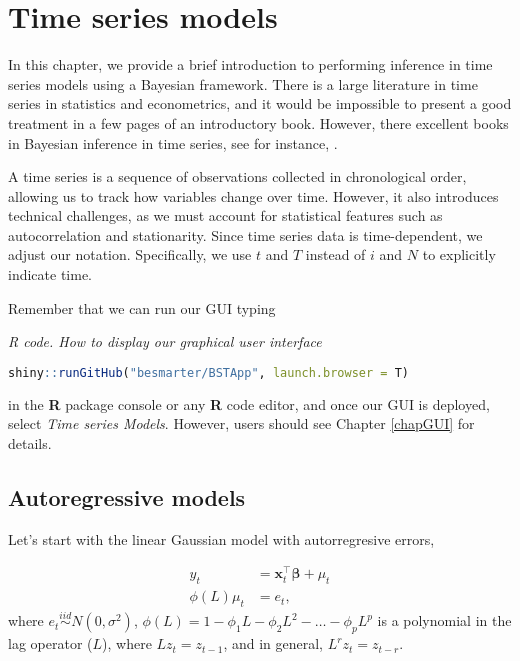 \chapter{Time series models}\label{chap8}
In this chapter, we provide a brief introduction to performing inference in time series models using a Bayesian framework. There is a large literature in time series in statistics and econometrics, and it would be impossible to present a good treatment in a few pages of an introductory book. However, there excellent books in Bayesian inference in time series, see for instance, \cite{west2006bayesian,petris2009dynamic,pole2018applied}.

A time series is a sequence of observations collected in chronological order, allowing us to track how variables change over time. However, it also introduces technical challenges, as we must account for statistical features such as autocorrelation and stationarity. Since time series data is time-dependent, we adjust our notation. Specifically, we use $t$ and $T$ instead of $i$ and $N$ to explicitly indicate time.

Remember that we can run our GUI typing

\begin{tcolorbox}[enhanced,width=4.67in,center upper,
	fontupper=\large\bfseries,drop shadow southwest,sharp corners]
	\textit{R code. How to display our graphical user interface}
	\begin{VF}
		\begin{lstlisting}[language=R]
		shiny::runGitHub("besmarter/BSTApp", launch.browser = T)\end{lstlisting}
	\end{VF}
\end{tcolorbox} 

in the \textbf{R} package console or any \textbf{R} code editor, and once our GUI is deployed, select \textit{Time series Models}. However, users should see Chapter \ref{chapGUI} for details.

\section{Autoregressive models}\label{sec81}

Let's start with the linear Gaussian model with autorregresive errors,

\begin{align}
	y_t & = \bm{x}_t^{\top}\bm{\beta}+\mu_t\label{eq1}\\
	\phi(L)\mu_t & = e_t \label{eq2}, 
\end{align}
where $e_t \stackrel{iid}{\sim} N(0,\sigma^2)$, $\phi(L)=1-\phi_1L-\phi_2L^2-\dots-\phi_pL^p$ is a polynomial in the lag operator ($L$), where $Lz_t=z_{t-1}$, and in general, $L^rz_t=z_{t-r}$.

